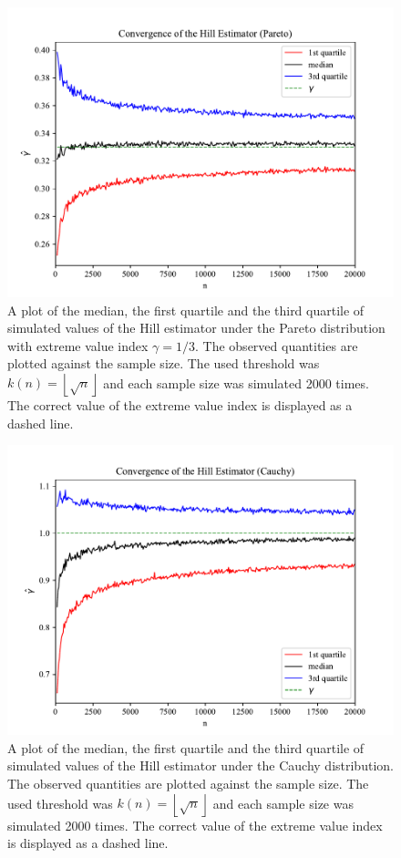 \documentclass[english,12pt,a4paper,pdftex,sci,utf8]{aaltothesis} %
\begin{document}
\begin{figure}[H]
\begin{center}
\includegraphics[width=\textwidth]{pareto.pdf}
\caption{A plot of the median, the first quartile and the third quartile of simulated values of the Hill estimator under the Pareto distribution with extreme value index $\gamma=1/3$. The observed quantities are plotted against the sample size. The used threshold was $k(n) = \left\lfloor \sqrt{n} \right\rfloor$ and each sample size was simulated 2000 times. The correct value of the extreme value index is displayed as a dashed line.}
\label{pareto}
\end{center}
\end{figure}

\begin{figure}[H]
\begin{center}
\includegraphics[width=\textwidth]{cauchy.pdf}
\caption{A plot of the median, the first quartile and the third quartile of simulated values of the Hill estimator under the Cauchy distribution. The observed quantities are plotted against the sample size. The used threshold was $k(n) = \left\lfloor \sqrt{n} \right\rfloor$ and each sample size was simulated 2000 times. The correct value of the extreme value index is displayed as a dashed line.}
\label{cauchy}
\end{center}
\end{figure}
\end{document}
